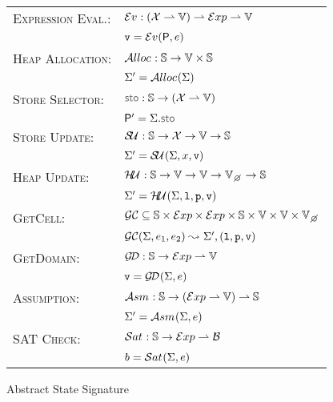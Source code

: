  \begin{figure}[h!]
 \begin{tabular}{ll}
 \textsc{Expression Eval.:} & $\mathcal{E}v_{} :  (\mathcal{X} \rightharpoonup \mathbb{V})  \rightharpoonup \mathcal{E}xp \rightharpoonup \mathbb{V}$ \\ 
                                                    & $\mathtt{v} = \mathcal{E}v_{}({\sf P}, e)$ \\[2pt]
 \textsc{Heap Allocation:}            & $\mathcal{A}lloc_{}: \mathbb{S} \rightarrow \mathbb{V} \times \mathbb{S}$ \\ 
                                                    & $\Sigma' = \mathcal{A}lloc_{}(\Sigma)$ \\[2pt]
\textsc{Store Selector:}                & $\stosel : \absstates \rightarrow (\jvars \partialmap \absvals)$ \\ 
                                                     & $\absstore' = \absstate.\stosel$ \\[2pt]
% 
\textsc{Store Update:}                 & $\mathcal{S\!U}_{}: \mathbb{S} \rightarrow \mathcal{X} \rightarrow \mathbb{V} \rightarrow \mathbb{S}$ \\
                                                    & $\Sigma' = \mathcal{S\!U}_{}(\Sigma, x, \mathtt{v})$ \\[2pt]
%             
\textsc{Heap Update:}                 & $\hpupdt{} : \absstates \rightarrow \absvals \rightarrow \absvals \rightarrow \setext{\absvals}{\none} \rightarrow \absstates$\\
                                                    & $\Sigma' = \mathcal{H\!U}_{}(\Sigma, \mathtt{l}, \mathtt{p}, \mathtt{v})$ \\[2pt]
 \textsc{GetCell:}                         & $\getcell \subseteq \absstates \times \exprs \times \exprs \times \absstates \times \absvals \times \absvals \times \setext{\absvals}{\none}$ \\ 
                                                    & $\mathcal{GC}(\Sigma, e_1, e_2) \leadsto_{} \Sigma', (\mathtt{l}, \mathtt{p}, \mathtt{v})$ \\[2pt]
%
 \textsc{GetDomain:}                   & $\mathcal{G\!D} : \mathbb{S} \rightarrow \mathcal{E}xp \rightharpoonup \mathbb{V}$ \\ 
                                                    & $\mathtt{v} = \mathcal{G\!D}_{}(\Sigma, e)$ \\[2pt]
% 
\textsc{Assumption:}                   & $\mathcal{A}{sm}_{} : \mathbb{S} \rightarrow (\mathcal{E}xp \rightharpoonup \mathbb{V}) \rightharpoonup \mathbb{S}$ \\ 
                                                    & $\Sigma' = \mathcal{A}{sm}_{}(\Sigma, e)$ \\[2pt]
%
\textsc{SAT Check:}                   & $\mathcal{S}at_{} : \mathbb{S} \rightarrow \mathcal{E}xp \rightharpoonup \mathcal{B}$ \\ 
                                                    & $b = \mathcal{S}at_{}(\Sigma, e)$ 
 \end{tabular}
 \vspace*{-0.3cm}
 \caption{Abstract State Signature}
 \end{figure}
 
